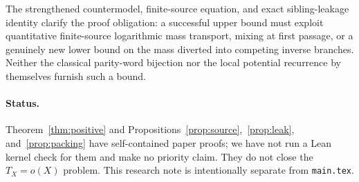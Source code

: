 \documentclass[11pt,a4paper]{article}
\begin{document}
The strengthened countermodel, finite-source equation, and exact
sibling-leakage identity clarify the proof obligation:
a successful upper bound must exploit quantitative finite-source
logarithmic mass transport, mixing at first passage, or a genuinely
new lower bound on the mass diverted into competing inverse branches.
Neither the classical parity-word bijection nor the local potential
recurrence by themselves furnish such a bound.

\paragraph{Status.} Theorem~\ref{thm:positive} and
Propositions~\ref{prop:source},~\ref{prop:leak},
and~\ref{prop:packing} have self-contained paper proofs;
we have not run a Lean kernel check for them and make no priority claim.
They do not close the $T_X=o(X)$ problem. This research note is
intentionally separate from \texttt{main.tex}.
\end{document}
